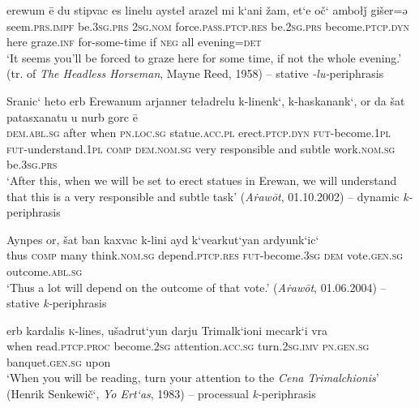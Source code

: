 \documentclass[output=paper,colorlinks,citecolor=brown]{langscibook}
\begin{document}
\ea \label{ex:meyer:modarm4}
\gll erewum ē du stipvac es linelu aysteł arazel {mi k‘ani žam}, et‘e oč‘ ambołǰ gišer=ə\\
	seem.\textsc{prs.impf} be.\textsc{3sg.prs} \textsc{2sg.nom} force.\textsc{pass.ptcp.res} be.\textsc{2sg.prs} become.\textsc{ptcp.dyn} here graze.\textsc{inf} for-some-time if \textsc{neg} all evening=\textsc{det}\\
	\glt ‘It seems you'll be forced to graze here for some time, if not the whole evening.’ (tr. of \textit{The Headless Horseman}, Mayne Reed, 1958) – stative \textit{-lu-}periphrasis
	\z {}
	
\ea \label{ex:meyer:modarm5}
\gll Sranic‘ heto erb Erewanum arjanner teładrelu k-linenk‘, k-haskanank‘, or da šat patasxanatu u nurb gorc ē\\
\textsc{dem.abl.sg} after when \textsc{pn.loc.sg} statue.\textsc{acc.pl} erect.\textsc{ptcp.dyn} \textsc{fut-}become.\textsc{1pl} \textsc{fut-}understand.\textsc{1pl} \textsc{comp} \textsc{dem.nom.sg} very responsible and subtle work.\textsc{nom.sg} be.\textsc{3sg.prs}\\
\glt ‘After this, when we will be set to erect statues in Erewan, we will understand that this is a very responsible and subtle task’ (\textit{Aṙawōt}, 01.10.2002) – dynamic \textit{k-}periphrasis
\z {}

\ea \label{ex:meyer:modarm6}
\gll Aynpes or, šat ban kaxvac k-lini ayd k‘vearkut‘yan ardyunk‘ic‘\\
thus \textsc{comp} many think.\textsc{nom.sg} depend.\textsc{ptcp.res} \textsc{fut-}become.\textsc{3sg} \textsc{dem} vote.\textsc{gen.sg} outcome.\textsc{abl.sg}\\
\glt ‘Thus a lot will depend on the outcome of that vote.’ (\textit{Aṙawōt}, 01.06.2004) – stative \textit{k-}periphrasis
\z {}

\ea \label{ex:meyer:modarm7}
\gll erb kardalis \textsc{k-}lines, ušadrut‘yun darju Trimalk‘ioni mecark‘i vra\\
when read.\textsc{ptcp.proc} become.\textsc{2sg} attention.\textsc{acc.sg} turn.\textsc{2sg.imv} \textsc{pn.gen.sg} banquet.\textsc{gen.sg} upon\\
\glt ‘When you will be reading, turn your attention to the \textit{Cena Trimalchionis}’ (Henrik Senkewič‘, \textit{Yo Ert‘as}, 1983) – processual \textit{k-}periphrasis
\z {}
	
\end{document}
